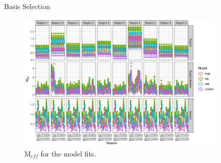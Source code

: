 \documentclass[final]{beamer}
\newlength{\sepwid}
\newlength{\onecolwid}
\newlength{\twocolwid}
\begin{document}
\begin{frame}[t]
\begin{columns}[t]
\begin{column}{\twocolwid}
\begin{columns}[t,totalwidth=\twocolwid]
\begin{column}{\onecolwid}

% 
% 


\end{column} %

\end{columns} %

\end{column} %

\begin{column}{\sepwid}\end{column} %

\begin{column}{\onecolwid} %


\begin{block}{Basis Selection}

\begin{figure}
\includegraphics[width=\linewidth]{plots/meff.png}
\caption{$\text{M}_{eff}$ for the model fits.}
\end{figure}


\end{block}
\end{column}
\end{columns}
\end{frame}
\end{document}
